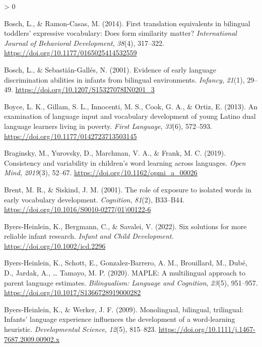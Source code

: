\documentclass[
  english,
  ,man,floatsintext]{apa6}
\newlength{\cslhangindent}
\newenvironment{CSLReferences}[2] %
 {%
  \setlength{\parindent}{0pt}
  \ifodd #1 \everypar{\setlength{\hangindent}{\cslhangindent}}\ignorespaces\fi
  \ifnum #2 > 0
  \setlength{\parskip}{#2\baselineskip}
  \fi
 }%
 {}
\begin{document}
\begin{CSLReferences}{1}{0}
\leavevmode\hypertarget{ref-Bosch_Ramon-Casas_2014}{}%
Bosch, L., \& Ramon-Casas, M. (2014). First translation equivalents in bilingual toddlers' expressive vocabulary: Does form similarity matter? \emph{International Journal of Behavioral Development}, \emph{38}(4), 317--322. \url{https://doi.org/10.1177/0165025414532559}

\leavevmode\hypertarget{ref-Bosch_Sebastian-Galles_2001}{}%
Bosch, L., \& Sebastián-Gallés, N. (2001). Evidence of early language discrimination abilities in infants from bilingual environments. \emph{Infancy}, \emph{21}(1), 29--49. \url{https://doi.org/10.1207/S15327078IN0201_3}

\leavevmode\hypertarget{ref-Boyce_etal_2013}{}%
Boyce, L. K., Gillam, S. L., Innocenti, M. S., Cook, G. A., \& Ortiz, E. (2013). An examination of language input and vocabulary development of young {L}atino dual language learners living in poverty. \emph{First Language}, \emph{33}(6), 572--593. \url{https://doi.org/10.1177/0142723713503145}

\leavevmode\hypertarget{ref-Braginsky_etal_2019}{}%
Braginsky, M., Yurovsky, D., Marchman, V. A., \& Frank, M. C. (2019). Consistency and variability in children's word learning across languages. \emph{Open Mind}, \emph{2019}(3), 52--67. \url{https://doi.org/10.1162/opmi_a_00026}

\leavevmode\hypertarget{ref-Brent_Siskind_2001}{}%
Brent, M. R., \& Siskind, J. M. (2001). The role of exposure to isolated words in early vocabulary development. \emph{Cognition}, \emph{81}(2), B33--B44. \url{https://doi.org/10.1016/S0010-0277(01)00122-6}

\leavevmode\hypertarget{ref-Byers-Heinlein_etal_2022}{}%
Byers-Heinlein, K., Bergmann, C., \& Savalei, V. (2022). Six solutions for more reliable infant research. \emph{Infant and Child Development}. \url{https://doi.org/10.1002/icd.2296}

\leavevmode\hypertarget{ref-Byers-Heinlein_etal_2020}{}%
Byers-Heinlein, K., Schott, E., Gonzalez-Barrero, A. M., Brouillard, M., Dubé, D., Jardak, A., \ldots{} Tamayo, M. P. (2020). MAPLE: A multilingual approach to parent language estimates. \emph{Bilingualism: Language and Cognition}, \emph{23}(5), 951--957. \url{https://doi.org/10.1017/S1366728919000282}

\leavevmode\hypertarget{ref-Byers-Heinlein_Werker_2009}{}%
Byers-Heinlein, K., \& Werker, J. F. (2009). Monolingual, bilingual, trilingual: Infants' language experience influences the development of a word-learning heuristic. \emph{Developmental Science}, \emph{12}(5), 815--823. \url{https://doi.org/10.1111/j.1467-7687.2009.00902.x}


\end{CSLReferences}
\end{document}
